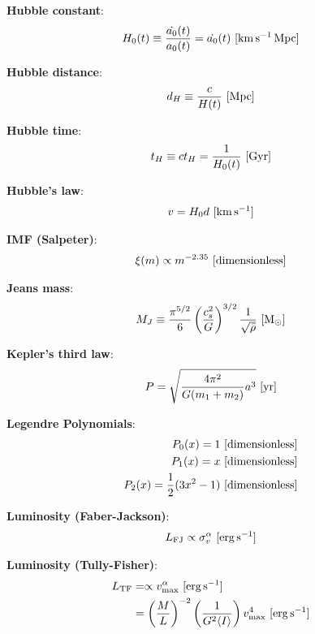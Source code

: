 \documentclass[a4paper,11pt]{article}
\begin{document}
{\noindent}\textbf{Hubble constant}:
\begin{align*}
    H_0(t) \equiv \dfrac{\dot{a_0}(t)}{a_0(t)} = \dot{a_0}(t) ~ [{\rm km\,s^{-1}\,Mpc}]
\end{align*}

{\noindent}\textbf{Hubble distance}:
\begin{align*}
    d_H \equiv \frac{c}{H(t)} ~ [{\rm Mpc}]
\end{align*}

{\noindent}\textbf{Hubble time}:
\begin{align*}
    t_H \equiv ct_H = \frac{1}{H_0(t)} ~ [{\rm Gyr}]
\end{align*}

{\noindent}\textbf{Hubble's law}:
\begin{align*}
    v = H_0d ~ [{\rm km\,s^{-1}}]
\end{align*}

{\noindent}\textbf{IMF (Salpeter)}:
\begin{align*}
    \xi(m) \propto m^{-2.35} ~ [{\rm dimensionless}]
\end{align*}

{\noindent}\textbf{Jeans mass}:
\begin{align*}
    M_J \equiv \frac{\pi^{5/2}}{6}\left(\frac{c_s^2}{G}\right)^{3/2}\frac{1}{\sqrt{\bar{\rho}}} ~ [{\rm M_\odot}]
\end{align*}

{\noindent}\textbf{Kepler's third law}:
\begin{align*}
    P = \sqrt{\frac{4\pi^2}{G(m_1+m_2)}a^3} ~ [{\rm yr}]
\end{align*}

{\noindent}\textbf{Legendre Polynomials}:
\begin{align*}
    P_0(x) = 1 ~ [{\rm dimensionless}] \\
    P_1(x) = x ~ [{\rm dimensionless}] \\
    P_2(x) = \frac{1}{2}(3x^2-1) ~ [{\rm dimensionless}]
\end{align*}

{\noindent}\textbf{Luminosity (Faber-Jackson)}:
\begin{align*}
    L_\mathrm{FJ} \propto \sigma_v^\alpha ~ [{\rm erg\,s^{-1}}]
\end{align*}

{\noindent}\textbf{Luminosity (Tully-Fisher)}:
\begin{align*}
    L_\mathrm{TF} &= \propto v_\mathrm{max}^\alpha ~ [{\rm erg\,s^{-1}}] \\
    &= \left(\frac{M}{L}\right)^{-2} \left(\frac{1}{G^2\langle I\rangle}\right)v_\mathrm{max}^4 ~ [{\rm erg\,s^{-1}}]
\end{align*}
\end{document}
